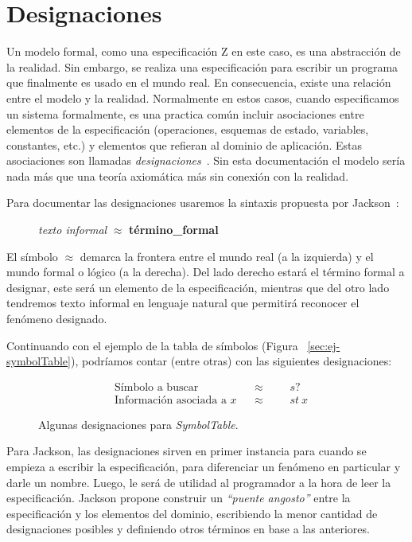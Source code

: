 \section{Designaciones}
\label{cap:designaciones}

Un modelo formal, como una especificación Z en este caso, es una abstracción de la realidad. Sin embargo, se realiza una especificación para escribir un programa que finalmente es usado en el mundo real. En consecuencia, existe una relación entre el modelo y la realidad.
Normalmente en estos casos, cuando especificamos un sistema formalmente, es una practica común incluir asociaciones entre elementos de la especificación (operaciones, esquemas de estado, variables, constantes, etc.) y elementos que refieran al dominio de aplicación. Estas asociaciones son llamadas \emph{designaciones}~\cite{jackson}.
Sin esta documentación el modelo sería nada más que una teoría axiomática más sin conexión con la realidad. 

Para documentar las designaciones usaremos la sintaxis propuesta por Jackson~\cite{jackson}:

\begin{figure}[H]
  \centering
  \emph{texto informal} $\approx$ \textbf{término\_formal}
\end{figure}

El símbolo $\approx$ demarca la frontera entre el mundo real (a la izquierda) y el mundo formal o lógico (a la derecha). Del lado derecho estará el término formal a designar, este será un elemento de la especificación, mientras que del otro lado tendremos texto informal en lenguaje natural que permitirá reconocer el fenómeno designado.

Continuando con el ejemplo de la tabla de símbolos (Figura ~\ref{sec:ej-symbolTable}), podríamos contar (entre otras) con las siguientes designaciones:

\begin{figure}[H]
  \begin{align*} 
    &\text{Símbolo a buscar} && \approx &&&s? \\
    &\text{Información asociada a $x$} && \approx &&&st~x
  \end{align*}
  \caption{Algunas designaciones para \emph{SymbolTable}.}
  \label{fig:ej_designacion}
\end{figure}


Para Jackson, las designaciones sirven en primer instancia para cuando se empieza a escribir la especificación, para diferenciar un fenómeno en particular y darle un nombre. Luego, le será de utilidad al programador a la hora de leer la especificación. Jackson propone construir un \emph{``puente angosto''} entre la especificación y los elementos del dominio, escribiendo la menor cantidad de designaciones posibles y definiendo otros términos en base a las anteriores.


